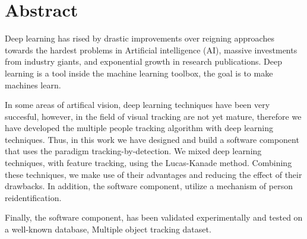 \chapter*{Abstract}

Deep learning has rised by drastic improvements over reigning approaches towards the hardest problems in Artificial intelligence (AI), massive investments from industry giants, and exponential growth in research publications. Deep learning is a tool inside the machine learning toolbox, the goal is to make machines learn.

In some areas of artifical vision, deep learning techniques have been very succesful, however, in the field of visual tracking are not yet mature, therefore we have developed the multiple people tracking algorithm with deep learning techniques. Thus, in this work we have designed and build a software component that uses the paradigm tracking-by-detection. We mixed deep learning techniques, with feature tracking, using the Lucas-Kanade method. Combining these techniques, we make use of their advantages and reducing the effect of their drawbacks. In addition, the software component, utilize a mechanism of person reidentification.

Finally, the software component, has been validated experimentally and tested on a well-known database, Multiple object tracking dataset.
